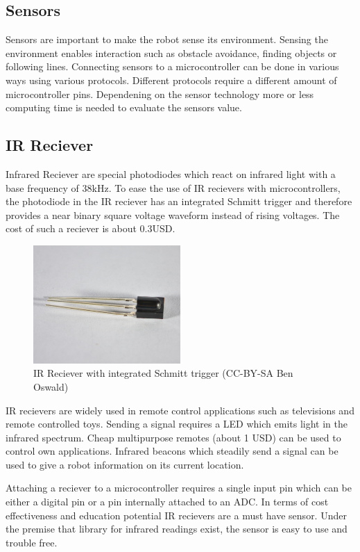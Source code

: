 \documentclass[11pt,a4paper]{article}
\begin{document}
\subsection{Sensors}
Sensors are important to make the robot sense its environment. Sensing the environment enables interaction such as obstacle avoidance, finding objects or following lines. Connecting sensors to a microcontroller can be done in various ways using various protocols. Different protocols require a different amount of microcontroller pins. Dependening on the sensor technology more or less computing time is needed to evaluate the sensors value.  

\subsection{IR Reciever}
Infrared Reciever are special photodiodes which react on infrared light with a base frequency of 38kHz. To ease the use of IR recievers with microcontrollers, the photodiode in the IR reciever has an integrated Schmitt trigger and therefore provides a near binary square voltage waveform instead of rising voltages. The cost of such a reciever is about 0.3USD.

\begin{figure}[h!]
  \centering
  \includegraphics[width=0.5\textwidth]{images/30_ir.jpg}
  \caption{IR Reciever with integrated Schmitt trigger (CC-BY-SA Ben Oswald)}
\end{figure}

IR recievers are widely used in remote control applications such as televisions and remote controlled toys. Sending a signal requires a LED which emits light in the infrared spectrum. Cheap multipurpose remotes (about 1 USD) can be used to control own applications. Infrared beacons which steadily send a signal can be used to give a robot information on its current location.

Attaching a reciever to a microcontroller requires a single input pin which can be either a digital pin or a pin internally attached to an ADC. In terms of cost effectiveness and education potential IR recievers are a must have sensor. Under the premise that library for infrared readings exist, the sensor is easy to use and trouble free.
\end{document}
